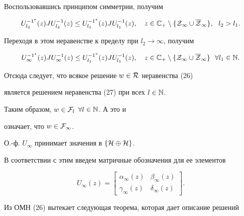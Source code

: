 \begin{pf}
Воспользовавшись принципом симметрии, получим


$$


U_{l_2}^{-1^* }(z)JU_{l_2}^{-1}(z) \leq


U_{l_1}^{-1^*}(z)J U_{l_1}^{-1}(z), \quad z \in {\Bbb C}_{+}


\setminus \{{\cal Z}_{\infty } \cup \overline {\cal Z}_{\infty } \},\ \


l_2>l_1.


$$


Переходя в этом неравенстве к пределу при $l_2\to \infty $, получим


$$


U_{\infty }^{-1^* }(z)JU_{\infty }^{-1}(z) \leq


U_{l_1}^{-1^*}(z)JU_{l_1}^{-1}(z), \quad z \in {\Bbb C}_{+}


\setminus \{{\cal Z}_{\infty } \cup \overline {\cal Z}_{\infty } \}\ \


\forall l_1 \in {\Bbb N}.


$$


Отсюда следует, что всякое решение $w\in {\cal R}$ неравенства (26)


является решением неравенства (27) при всех $l\in {\Bbb N}$.


Таким образом, $w\in {\cal F}_l$ $\forall l\in {\Bbb N}$. А это и


означает, что $w\in {\cal F}_{\infty } $.


\end{pf}





О.-ф. $U_{\infty }$ принимает значения в $\{ {\cal H} \oplus {\cal H} \}$.


В соответствии с этим введем матричные обозначения для ее элементов


$$


U_{\infty }(z)=


\begin{bmatrix}


\alpha _{\infty }(z) & \beta _{\infty }(z) \\


\gamma _{\infty }(z) & \delta _{\infty }(z)


\end{bmatrix}.


$$





Из ОМН (26) вытекает следующая теорема, которая дает описание решений


